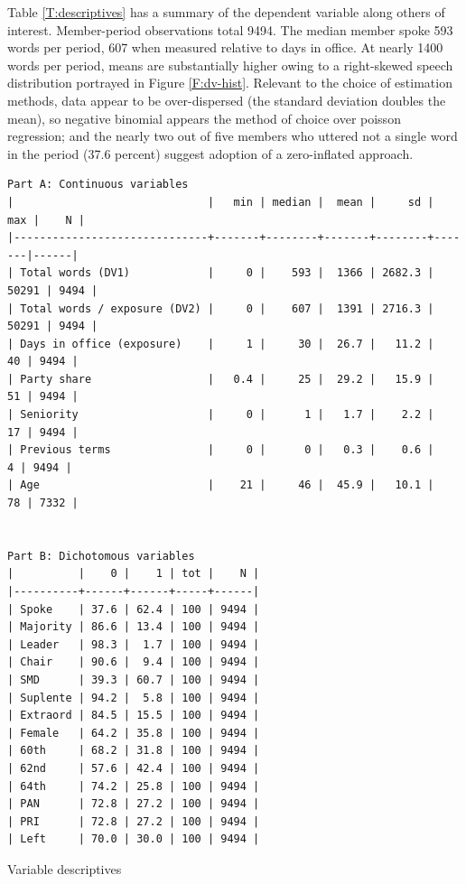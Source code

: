 \documentclass[letter,12pt]{article}
\begin{document}
Table \ref{T:descriptives} has a summary of the dependent variable along others of interest. Member-period observations total 9494. The median member spoke 593 words per period, 607 when measured relative to days in office. At nearly 1400 words per period, means are substantially higher owing to a right-skewed speech distribution portrayed in Figure \ref{F:dv-hist}. Relevant to the choice of estimation methods, data appear to be over-dispersed (the standard deviation doubles the mean), so negative binomial appears the method of choice over poisson regression; and the nearly two out of five members who uttered not a single word in the period (37.6 percent) suggest adoption of a zero-inflated approach.

\begin{table}
  \begin{scriptsize}
    \begin{verbatim}
Part A: Continuous variables
|                              |   min | median |  mean |     sd |   max |    N |
|------------------------------+-------+--------+-------+--------+-------|------|
| Total words (DV1)            |     0 |    593 |  1366 | 2682.3 | 50291 | 9494 |
| Total words / exposure (DV2) |     0 |    607 |  1391 | 2716.3 | 50291 | 9494 |
| Days in office (exposure)    |     1 |     30 |  26.7 |   11.2 |    40 | 9494 |
| Party share                  |   0.4 |     25 |  29.2 |   15.9 |    51 | 9494 |
| Seniority                    |     0 |      1 |   1.7 |    2.2 |    17 | 9494 |
| Previous terms               |     0 |      0 |   0.3 |    0.6 |     4 | 9494 |
| Age                          |    21 |     46 |  45.9 |   10.1 |    78 | 7332 |


Part B: Dichotomous variables
|          |    0 |    1 | tot |    N |
|----------+------+------+-----+------|
| Spoke    | 37.6 | 62.4 | 100 | 9494 |
| Majority | 86.6 | 13.4 | 100 | 9494 |
| Leader   | 98.3 |  1.7 | 100 | 9494 |
| Chair    | 90.6 |  9.4 | 100 | 9494 |
| SMD      | 39.3 | 60.7 | 100 | 9494 |
| Suplente | 94.2 |  5.8 | 100 | 9494 |
| Extraord | 84.5 | 15.5 | 100 | 9494 |
| Female   | 64.2 | 35.8 | 100 | 9494 |
| 60th     | 68.2 | 31.8 | 100 | 9494 |
| 62nd     | 57.6 | 42.4 | 100 | 9494 |
| 64th     | 74.2 | 25.8 | 100 | 9494 |
| PAN      | 72.8 | 27.2 | 100 | 9494 |
| PRI      | 72.8 | 27.2 | 100 | 9494 |
| Left     | 70.0 | 30.0 | 100 | 9494 |
    \end{verbatim}
  \end{scriptsize}
\caption{Variable descriptives}\label{T:descriptives}
\end{table}
\end{document}

